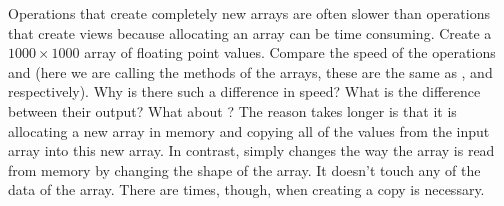 \begin{problem} Operations that create completely new arrays are often
slower than operations that create views because allocating an array can
be time consuming. Create a $1000 \times 1000$ array  of floating
point values. Compare the speed of the operations 
and  (here we are calling the methods of the arrays,
these are the same as , and 
respectively). Why is there such a difference in speed? What is the
difference between their output? What about ?
The reason  takes longer is that it is allocating a new
array in memory and copying all of the values from the input array into
this new array. In contrast,  simply changes the way the
array is read from memory by changing the shape of the array. It doesn't
touch any of the data of the array. There are times, though, when
creating a copy is necessary. \end{problem}

